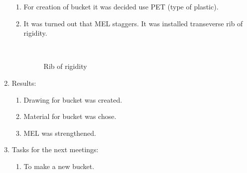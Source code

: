 \begin{enumerate}
\begin{enumerate}
	  \item For creation of bucket it was decided use PET (type of plastic).
	  
	  \item It was turned out that MEL staggers. It was installed transeverse rib of rigidity.
	  
	  \begin{figure}[H]
	  	\begin{minipage}[h]{0.2\linewidth}
	  		\center  
	  	\end{minipage}
	  	\begin{minipage}[h]{0.6\linewidth}
	  		\caption{Rib of rigidity}
	  	\end{minipage}
	  \end{figure}
	  
    \end{enumerate}
    
	\item Results: 
	\begin{enumerate}
	  \item Drawing for bucket was created.
	  
	  \item Material for bucket was chose.
	  
	  \item MEL was strengthened.
	  
    \end{enumerate}
    
	\item Tasks for the next meetings:
	\begin{enumerate}
	  \item To make a new bucket.
	  
    \end{enumerate}     
\end{enumerate}
\fillpage